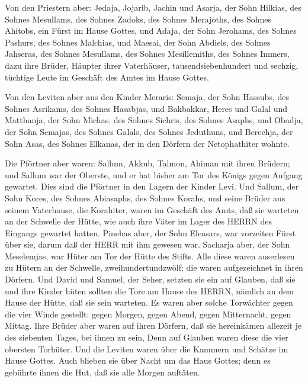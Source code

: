  Von den Priestern aber: Jedaja, Jojarib, Jachin
 und Asarja, der Sohn Hilkias, des Sohnes Mesullams, des
Sohnes Zadoks, des Sohnes Merajoths, des Sohnes Ahitobs, ein Fürst im
Hause Gottes,  und Adaja, der Sohn Jerohams, des Sohnes
Pashurs, des Sohnes Malchias, und Maesai, der Sohn Abdiels, des Sohnes
Jahseras, des Sohnes Mesullams, des Sohnes Mesillemiths, des Sohnes
Immers,  dazu ihre Brüder, Häupter ihrer Vaterhäuser,
tausendsiebenhundert und sechzig, tüchtige Leute im Geschäft des Amtes
im Hause Gottes.

 Von den Leviten aber aus den Kinder Meraris: Semaja, der
Sohn Hassubs, des Sohnes Asrikams, des Sohnes Hasabjas, 
und Bakbakkar, Heres und Galal und Matthanja, der Sohn Michas, des
Sohnes Sichris, des Sohnes Asaphs,  und Obadja, der Sohn
Semajas, des Sohnes Galals, des Sohnes Jeduthuns, und Berechja, der Sohn
Asas, des Sohnes Elkanas, der in den Dörfern der Netophathiter wohnte.

 Die Pförtner aber waren: Sallum, Akkub, Talmon, Ahiman mit
ihren Brüdern; und Sallum war der Oberste,  und er hat
bisher am Tor des Königs gegen Aufgang gewartet. Dies sind die Pförtner
in den Lagern der Kinder Levi.  Und Sallum, der Sohn Kores,
des Sohnes Abiasaphs, des Sohnes Korahs, und seine Brüder aus seinem
Vaterhause, die Korahiter, waren im Geschäft des Amts, daß sie warteten
an der Schwelle der Hütte, wie auch ihre Väter im Lager des HERRN des
Eingangs gewartet hatten.  Pinehas aber, der Sohn Eleasars,
war vorzeiten Fürst über sie, darum daß der HERR mit ihm gewesen war.
 Sacharja aber, der Sohn Meselemjas, war Hüter am Tor der
Hütte des Stifts.  Alle diese waren auserlesen zu Hütern an
der Schwelle, zweihundertundzwölf; die waren aufgezeichnet in ihren
Dörfern. Und David und Samuel, der Seher, setzten sie ein auf Glauben,
 daß sie und ihre Kinder hüten sollten die Tore am Hause
des HERRN, nämlich an dem Hause der Hütte, daß sie sein warteten.
 Es waren aber solche Torwächter gegen die vier Winde
gestellt: gegen Morgen, gegen Abend, gegen Mitternacht, gegen Mittag.
 Ihre Brüder aber waren auf ihren Dörfern, daß sie
hereinkämen allezeit je des siebenten Tages, bei ihnen zu sein,
 Denn auf Glauben waren diese die vier obersten Torhüter.
Und die Leviten waren über die Kammern und Schätze im Hause Gottes.
 Auch blieben sie über Nacht um das Haus Gottes; denn es
gebührte ihnen die Hut, daß sie alle Morgen auftäten.

